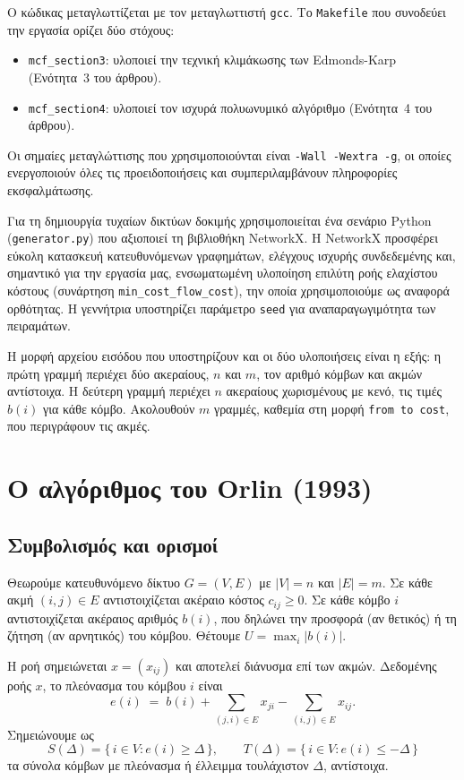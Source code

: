 \documentclass[11pt,a4paper,oneside]{report}
\begin{document}
Ο κώδικας μεταγλωττίζεται με τον μεταγλωττιστή \texttt{gcc}. Το \texttt{Makefile} που συνοδεύει την εργασία ορίζει δύο στόχους:
\begin{itemize}
  \item \texttt{mcf\_section3}: υλοποιεί την τεχνική κλιμάκωσης των \textenglish{Edmonds-Karp} (Ενότητα~3 του άρθρου).
  \item \texttt{mcf\_section4}: υλοποιεί τον ισχυρά πολυωνυμικό αλγόριθμο (Ενότητα~4 του άρθρου).
\end{itemize}
Οι σημαίες μεταγλώττισης που χρησιμοποιούνται είναι \texttt{-Wall -Wextra -g}, οι οποίες ενεργοποιούν όλες τις προειδοποιήσεις και συμπεριλαμβάνουν πληροφορίες εκσφαλμάτωσης.

Για τη δημιουργία τυχαίων δικτύων δοκιμής χρησιμοποιείται ένα σενάριο \textenglish{Python} (\texttt{generator.py}) που αξιοποιεί τη βιβλιοθήκη \textenglish{NetworkX}. Η \textenglish{NetworkX} προσφέρει εύκολη κατασκευή κατευθυνόμενων γραφημάτων, ελέγχους ισχυρής συνδεδεμένης και, σημαντικό για την εργασία μας, ενσωματωμένη υλοποίηση επιλύτη ροής ελαχίστου κόστους (συνάρτηση \texttt{min\_cost\_flow\_cost}), την οποία χρησιμοποιούμε ως αναφορά ορθότητας. Η γεννήτρια υποστηρίζει παράμετρο \texttt{seed} για αναπαραγωγιμότητα των πειραμάτων.

Η μορφή αρχείου εισόδου που υποστηρίζουν και οι δύο υλοποιήσεις είναι η εξής: η πρώτη γραμμή περιέχει δύο ακεραίους, $n$ και $m$, τον αριθμό κόμβων και ακμών αντίστοιχα. Η δεύτερη γραμμή περιέχει $n$ ακεραίους χωρισμένους με κενό, τις τιμές $b(i)$ για κάθε κόμβο. Ακολουθούν $m$ γραμμές, καθεμία στη μορφή \texttt{from to cost}, που περιγράφουν τις ακμές.

\chapter{Ο αλγόριθμος του \textenglish{Orlin} (1993)}

\section{Συμβολισμός και ορισμοί}

Θεωρούμε κατευθυνόμενο δίκτυο $G=(V,E)$ με $|V|=n$ και $|E|=m$. Σε κάθε ακμή $(i,j) \in E$ αντιστοιχίζεται ακέραιο κόστος $c_{ij} \geq 0$. Σε κάθε κόμβο $i$ αντιστοιχίζεται ακέραιος αριθμός $b(i)$, που δηλώνει την προσφορά (αν θετικός) ή τη ζήτηση (αν αρνητικός) του κόμβου. Θέτουμε $U = \max_{i} |b(i)|$.

Η ροή σημειώνεται $x = (x_{ij})$ και αποτελεί διάνυσμα επί των ακμών. Δεδομένης ροής $x$, το πλεόνασμα του κόμβου $i$ είναι
\[
e(i) \;=\; b(i) + \sum_{(j,i)\in E} x_{ji} - \sum_{(i,j)\in E} x_{ij}.
\]
Σημειώνουμε ως
\[
S(\Delta) = \{\, i \in V : e(i) \geq \Delta \,\}, \qquad T(\Delta) = \{\, i \in V : e(i) \leq -\Delta \,\}
\]
τα σύνολα κόμβων με πλεόνασμα ή έλλειμμα τουλάχιστον $\Delta$, αντίστοιχα.
\end{document}
